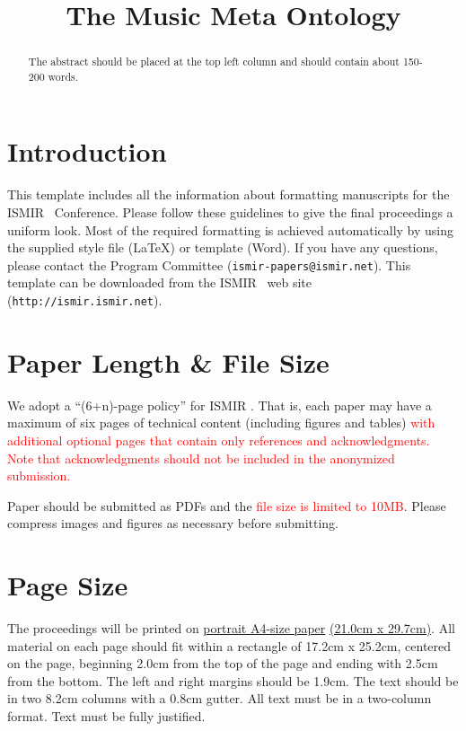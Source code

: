\documentclass{article}
\title{The Music Meta Ontology}
\begin{document}
%
\maketitle
%
\begin{abstract}
The abstract should be placed at the top left column and should contain about 150-200 words.
\end{abstract}
%
\section{Introduction}\label{sec:introduction}

This template includes all the information about formatting manuscripts for the ISMIR \conferenceyear\ Conference.
Please follow these guidelines to give the final proceedings a uniform look.
Most of the required formatting is achieved automatically by using the supplied
style file (\LaTeX) or template (Word).
If you have any questions, please contact the Program Committee (\texttt{ismir\conferenceyear-papers@ismir.net}).
This template can be downloaded from the ISMIR \conferenceyear\ web site (\texttt{http://ismir\conferenceyear.ismir.net}).
%
\section{Paper Length \& File Size}
We adopt a ``(6+n)-page policy'' for ISMIR \conferenceyear. That is, each paper may have a maximum of six pages of technical content (including figures and tables) \textcolor{red}{with additional optional pages that contain only references and acknowledgments. Note that acknowledgments should not be included in the anonymized submission.}

Paper should be submitted as PDFs and the \textcolor{red}{file size is limited to 10MB}. Please compress images and figures as necessary before submitting.

\section{Page Size}\label{sec:page_size}

The proceedings will be printed on
 \underline{portrait A4-size paper} \underline{(21.0cm x 29.7cm)}.
All material on each page should fit within a rectangle of 17.2cm x 25.2cm,
centered on the page, beginning 2.0cm
from the top of the page and ending with 2.5cm from the bottom.
The left and right margins should be 1.9cm.
The text should be in two 8.2cm columns with a 0.8cm gutter.
All text must be in a two-column format.
Text must be fully justified.
\end{document}

